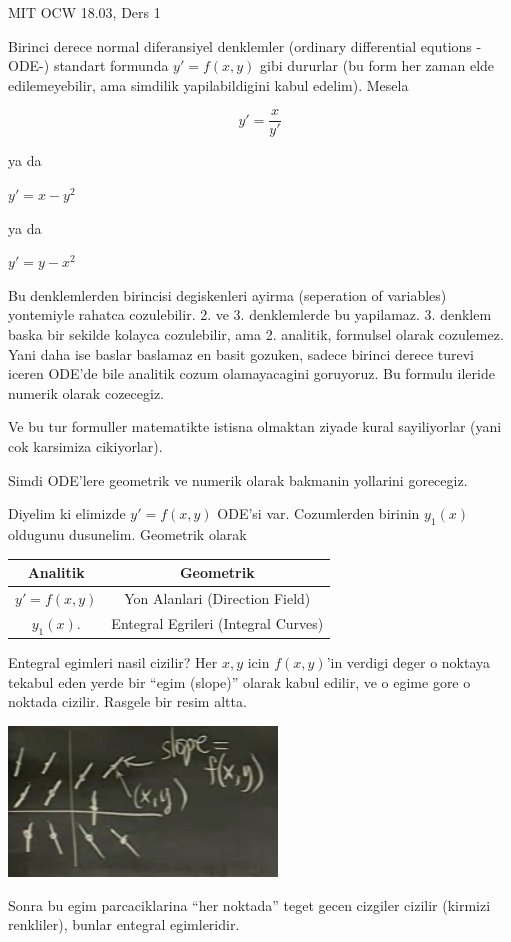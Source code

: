 \documentclass[12pt,fleqn]{article}
\begin{document}
MIT OCW 18.03, Ders 1

Birinci derece normal diferansiyel denklemler (ordinary differential equtions
-ODE-) standart formunda $y'=f(x,y)$ gibi dururlar (bu form her zaman
elde edilemeyebilir, ama simdilik yapilabildigini kabul edelim).  Mesela

\[ y' = \frac{x}{y'} \] 

ya da

$y' = x-y^2$ 

ya da

$y' = y-x^2$

Bu denklemlerden birincisi degiskenleri ayirma (seperation of variables)
yontemiyle rahatca cozulebilir. 2. ve 3. denklemlerde bu yapilamaz. 3. denklem
baska bir sekilde kolayca cozulebilir, ama 2. analitik, formulsel olarak
cozulemez. Yani daha ise baslar baslamaz en basit gozuken, sadece birinci derece
turevi iceren ODE'de bile analitik cozum olamayacagini goruyoruz. Bu formulu
ileride numerik olarak cozecegiz.

Ve bu tur formuller matematikte istisna olmaktan ziyade kural sayiliyorlar (yani
cok karsimiza cikiyorlar). 

Simdi ODE'lere geometrik ve numerik olarak bakmanin yollarini gorecegiz.

Diyelim ki elimizde $y' = f(x,y)$ ODE'si var. Cozumlerden birinin
$y_1(x)$ oldugunu dusunelim. Geometrik olarak 

\begin{tabular}{cc}
Analitik & Geometrik \\ \hline
$y' = f(x,y)$ & Yon Alanlari (Direction Field) \\
$y_1(x)$. & Entegral Egrileri (Integral Curves)
\end{tabular}

Entegral egimleri nasil cizilir? Her $x,y$ icin $f(x,y)$'in verdigi deger o
noktaya tekabul eden yerde bir ``egim (slope)'' olarak kabul edilir, ve o egime
gore o noktada cizilir. Rasgele bir resim altta.

\includegraphics[height=4cm]{./1_1.png}

Sonra bu egim parcaciklarina ``her noktada'' teget gecen cizgiler cizilir
(kirmizi renkliler), bunlar entegral egimleridir.
\end{document}
